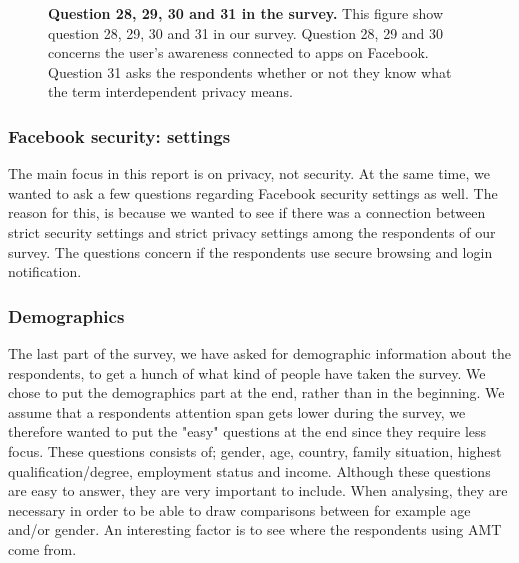 \begin{figure}[h!]
\centering
{}
\caption[Question 28, 29, 30 and 31 in the survey]{\textbf{Question 28, 29, 30 and 31 in the survey.} This figure show question 28, 29, 30 and 31 in our survey. Question 28, 29 and 30 concerns the user's awareness connected to apps on Facebook. Question 31 asks the respondents whether or not they know what the term interdependent privacy means.} 
\label{fig:page15}
\end{figure}

\subsubsection{Facebook security: settings}
The main focus in this report is on privacy, not security. At the same time, we wanted to ask a few questions regarding Facebook security settings as well. The reason for this, is because we wanted to see if there was a connection between strict security settings and strict privacy settings among the respondents of our survey. The questions concern if the respondents use secure browsing and login notification.

\subsubsection{Demographics}
The last part of the survey, we have asked for demographic information about the respondents, to get a hunch of what kind of people have taken the survey. We chose to put the demographics part at the end, rather than in the beginning. We assume that a respondents attention span gets lower during the survey, we therefore wanted to put the "easy" questions at the end since they require less focus. These questions consists of; gender, age, country, family situation, highest qualification/degree, employment status and income. Although these questions are easy to answer, they are very important to include. When analysing, they are necessary in order to be able to draw comparisons between for example age and/or gender. An interesting factor is to see where the respondents using AMT come from.  

